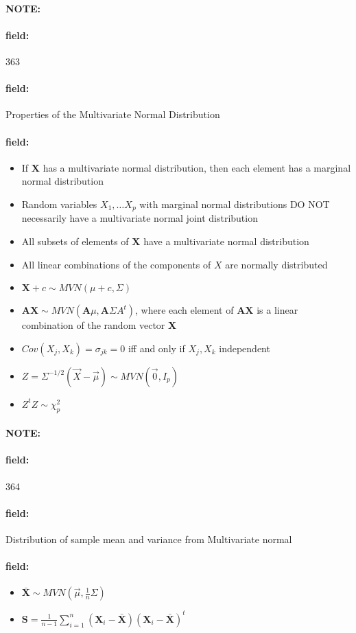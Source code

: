 \documentclass[12pt]{article}
\newenvironment{note}{\paragraph{NOTE:}}{}
\newenvironment{field}{\paragraph{field:}}{}
\begin{document}
\begin{note}
    \begin{field}
        \tiny 363
    \end{field}
    \begin{field}
        Properties of the Multivariate Normal Distribution
    \end{field}
    \begin{field}
        \begin{itemize}
          \item If $\mathbf{X}$ has a multivariate normal distribution, then each element has a marginal normal distribution
          \item Random variables $X_1, \ldots X_p$ with marginal normal distributions DO NOT necessarily have a multivariate normal joint distribution
          \item All subsets of elements of $\mathbf{X}$ have a multivariate normal distribution
          \item All linear combinations of the components of $X$ are normally distributed
          \item $\mathbf{X} + c \sim MVN(\mu + c, \Sigma)$
          \item $\mathbf{AX} \sim MVN(\mathbf{A}\mu, \mathbf{A} \Sigma A^t)$, where each element of $\mathbf{AX}$ is a linear combination of the random vector \textbf{X}
          \item $Cov(X_j,X_k) = \sigma_{jk} = 0$ iff and only if $X_j,X_k$ independent
          \item $Z = \Sigma^{-1/2}(\vec{X} - \vec{\mu}) \sim MVN(\vec{0},I_p)$
          \item $Z^tZ \sim \chi^2_p$

        \end{itemize}
    \end{field}
\end{note}


\begin{note}
    \begin{field}
        \tiny 364
    \end{field}
    \begin{field}
        Distribution of sample mean and variance from Multivariate normal
    \end{field}
    \begin{field}
        \begin{itemize}
          \item $\mathbf{\bar{X}} \sim MVN(\vec{\mu}, \frac{1}{n}\Sigma)$
          \item $\mathbf{S} = \frac{1}{n-1}\sum_{i=1}^n(\mathbf{X}_i - \mathbf{\bar{X}})(\mathbf{X}_i - \mathbf{\bar{X}})^t$
        \end{itemize}
    \end{field}
\end{note}
\end{document}
